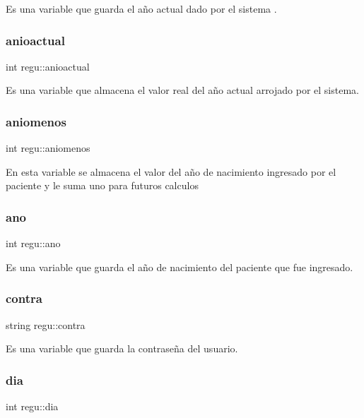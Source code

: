Es una variable que guarda el año actual dado por el sistema . \mbox{\label{classregu_a9a71f2940cd6150de74b89f063682ce1}} 
\subsubsection{\texorpdfstring{anioactual}{anioactual}}
{\footnotesize\ttfamily int regu\+::anioactual}

Es una variable que almacena el valor real del año actual arrojado por el sistema. \mbox{\label{classregu_a79d9c62c9fc46b699f5985b693525bfb}} 
\subsubsection{\texorpdfstring{aniomenos}{aniomenos}}
{\footnotesize\ttfamily int regu\+::aniomenos}

En esta variable se almacena el valor del año de nacimiento ingresado por el paciente y le suma uno para futuros calculos \mbox{\label{classregu_a6e25f0b6f043c6f8c563e07b557e90be}} 
\subsubsection{\texorpdfstring{ano}{ano}}
{\footnotesize\ttfamily int regu\+::ano}

Es una variable que guarda el año de nacimiento del paciente que fue ingresado. \mbox{\label{classregu_a5293f6cb33494cf1701c643b2ff17b4b}} 
\subsubsection{\texorpdfstring{contra}{contra}}
{\footnotesize\ttfamily string regu\+::contra}

Es una variable que guarda la contraseña del usuario. \mbox{\label{classregu_a224486fd0b438d8c2fa9339e0df2e2d3}} 
\subsubsection{\texorpdfstring{dia}{dia}}
{\footnotesize\ttfamily int regu\+::dia}

